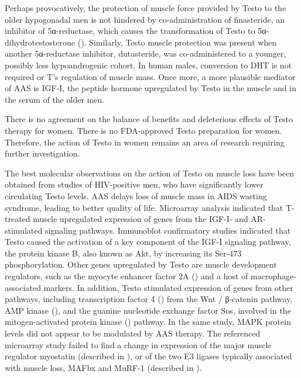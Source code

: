 \documentclass[12pt,english]{report}\usepackage[]{graphicx}\usepackage[]{color}
\begin{document}
Perhaps provocatively, the protection of muscle force provided by
Testo to the older hypogonadal men is not hindered by co-administration
of finasteride, an inhibitor of 5α-reductase, which causes the transformation
of Testo to 5α-dihydrotestosterone ()\citep{borst2014musculoskeletal}.
Similarly, Testo muscle protection was present when another 5α-reductase
inhibitor, dutasteride, was co-administered to a younger, possibly
less hypoandrogenic cohort\citep{bhasin2012effect}. In human males,
conversion to DHT is not required or T's regulation of muscle mass.
Once more, a more plausible mediator of AAS is IGF-I, the peptide
hormone upregulated by Testo in the muscle and in the serum of the
older men\citep{ferrando2002testosterone,huang2005effects}. 

There is no agreement on the balance of benefits and deleterious effects
of Testo therapy for women\citep{traish2009testosterone,wierman2014androgen}.
There is no FDA-approved Testo preparation for women. Therefore, the
action of Testo in women remains an area of research requiring further
investigation.

The best molecular observations on the action of Testo on muscle loss
have been obtained from studies of HIV-positive men, who have significantly
lower circulating Testo levels\citep{croxson1989changes}. AAS delays
loss of muscle mass in AIDS wasting syndrome, leading to better quality
of life\citep{grinspoon1998effects}. Microarray analysis indicated
that T-treated muscle upregulated expression of genes from the IGF-I-
and AR-stimulated signaling pathways\citep{montano2007transcriptional}.
Immunoblot confirmatory studies indicated that Testo caused the activation
of a key component of the IGF-I signaling pathway, the protein kinase
B, also known as Akt, by increasing its Ser-473 phosphorylation. Other
genes upregulated by Testo are muscle development regulators, such
as the myocyte enhancer factor 2A ()
and a host of macrophage-associated markers. In addition, Testo stimulated
expression of genes from other pathways, including transcription factor
4 () from the Wnt / β-catenin
pathway, AMP kinase (),
and the guanine nucleotide exchange factor Sos, involved in the mitogen-activated
protein kinase ()
pathway. In the same study, MAPK protein levels did not appear to
be modulated by AAS therapy. The referenced microarray study failed
to find a change in expression of the major muscle regulator myostatin
(described in \citep{mcpherron1997regulation,gonzalez-cadavid1998organization}),
or of the two E3 ligases typically associated with muscle loss, MAFbx
and MuRF-1 (described in \citep{bodine2001identification,gustafsson2010effects}).
\end{document}
